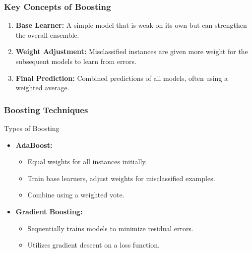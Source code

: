 \documentclass[aspectratio=169]{beamer}
\begin{document}
\begin{frame}[fragile]
    \frametitle{Key Concepts of Boosting}
    \begin{enumerate}
        \item \textbf{Base Learner:} A simple model that is weak on its own but can strengthen the overall ensemble.
        \item \textbf{Weight Adjustment:} Misclassified instances are given more weight for the subsequent models to learn from errors.
        \item \textbf{Final Prediction:} Combined predictions of all models, often using a weighted average.
    \end{enumerate}
\end{frame}

\begin{frame}[fragile]
    \frametitle{Boosting Techniques}
    \begin{block}{Types of Boosting}
        \begin{itemize}
            \item \textbf{AdaBoost:}
            \begin{itemize}
                \item Equal weights for all instances initially.
                \item Train base learners, adjust weights for misclassified examples.
                \item Combine using a weighted vote.
            \end{itemize}
        
            \item \textbf{Gradient Boosting:}
            \begin{itemize}
                \item Sequentially trains models to minimize residual errors.
                \item Utilizes gradient descent on a loss function.
            \end{itemize}
        \end{itemize}
    \end{block}
\end{frame}
\end{document}
